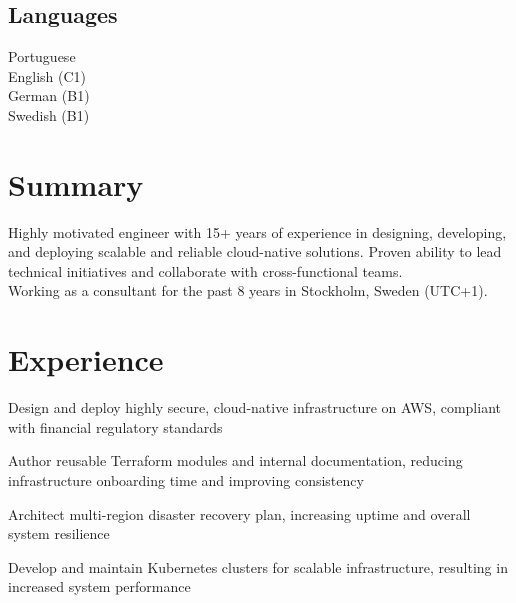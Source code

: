 \documentclass[]{willianpaixao-resume}
\begin{document}
\begin{minipage}[t]{0.34\textwidth}
\subsection{Languages}
Portuguese\\
English (C1)\\
German (B1)\\
Swedish (B1)
\sectionsep


\end{minipage}
\hfill
\begin{minipage}[t]{0.64\textwidth}

\section{Summary}
Highly motivated engineer with 15+ years of experience in designing, developing, and deploying scalable and reliable cloud-native solutions. Proven ability to lead technical initiatives and collaborate with cross-functional teams.\\
Working as a consultant for the past 8 years in Stockholm, Sweden (UTC+1).

\section{Experience}
\sectionsep
\begin{tightemize}
\item Design and deploy highly secure, cloud-native infrastructure on AWS, compliant with financial regulatory standards
\item Author reusable Terraform modules and internal documentation, reducing infrastructure onboarding time and improving consistency
\end{tightemize}
\sectionsep
{}
\begin{tightemize}
\item Architect multi-region disaster recovery plan, increasing uptime and overall system resilience
\item Develop and maintain Kubernetes clusters for scalable infrastructure, resulting in increased system performance
\end{tightemize}
\sectionsep


\end{minipage}
\end{document}
